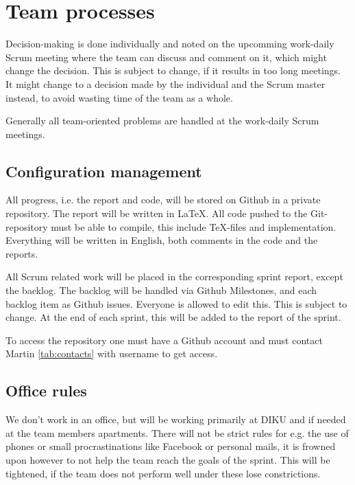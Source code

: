 \section{Team processes}

Decision-making is done individually and noted on the upcomming work-daily Scrum meeting where the team can discuss and comment on it, which might change the decision. This is subject to change, if it results in too long meetings. It might change to a decision made by the individual and the Scrum master instead, to avoid wasting time of the team as a whole.

Generally all team-oriented problems are handled at the work-daily Scrum meetings.

\subsection{Configuration management}
All progress, i.e. the report and code, will be stored on Github in a private repository.
The report will be written in \LaTeX.
All code pushed to the Git-repository must be able to compile, this include \TeX-files and implementation.
Everything will be written in English, both comments in the code and the reports.

All Scrum related work will be placed in the corresponding sprint report, except the backlog. The backlog will be handled via Github Milestones, and each backlog item as Github issues. Everyone is allowed to edit this. This is subject to change. At the end of each sprint, this will be added to the report of the sprint.

To access the repository one must have a Github account and must contact Martin \ref{tab:contacts} with username to get access.


\subsection{Office rules}
We don't work in an office, but will be working primarily at DIKU and if needed at the team members apartments. There will not be strict rules for e.g. the use of phones or small procrastinations like Facebook or personal mails, it is frowned upon however to not help the team reach the goals of the sprint. This will be tightened, if the team does not perform well under these lose constrictions.

